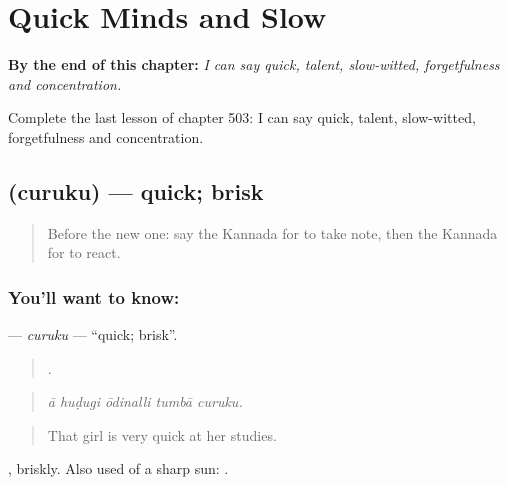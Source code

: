 
\chapter{Quick Minds and Slow}
\label{ch:ka-quick-minds-and-slow}

\begin{chapteropening}
\textbf{By the end of this chapter:} \emph{I can say quick, talent, slow-witted, forgetfulness and concentration.}

Complete the last lesson of chapter 503: I can say quick, talent, slow-witted, forgetfulness and concentration.
\end{chapteropening}

\section[\texorpdfstring{\kn{ಚುರುಕು} (curuku)}{ಚುರುಕು (curuku)}]{ (curuku) — quick; brisk}

\label{lesson:KA-C503-curuku}



\begin{quote}
Before the new one: say the Kannada for to take note, then the Kannada for to react.
\end{quote}

\subsection*{You'll want to know: }
\textbf{} — \emph{curuku} — \textquotedblleft{}quick; brisk\textquotedblright{}.

\begin{quote}
    .
\end{quote}

\begin{quote}
\emph{ā huḍugi ōdinalli tumbā curuku.}
\end{quote}

\begin{quote}
That girl is very quick at her studies.
\end{quote}

, briskly. Also used of a sharp sun:  .

